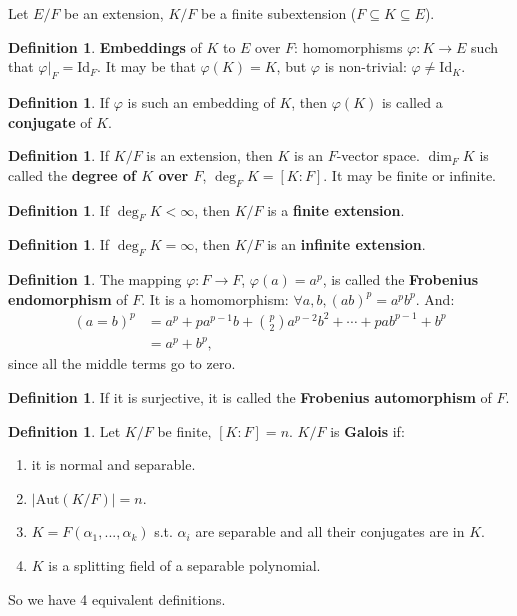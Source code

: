 \documentclass[9pt,reqno,twoside]{amsbook}
\theoremstyle{plain}
\numberwithin{section}{chapter}
\numberwithin{equation}{chapter}
\theoremstyle{definition}
\newtheorem{Def}[theorem]{Definition}
\theoremstyle{remark}
\theoremstyle{plain}
\newcommand{\sub}{\subseteq}
\newcommand{\bee}{\begin{equation}\begin{aligned}}
\newcommand{\eee}{\end{aligned}\end{equation}}
\renewcommand{\phi}{\varphi}
\begin{document}
Let $E/F$ be an extension, $K/F$ be a finite subextension ($F\sub K \sub E$). 

\begin{Def}
\textbf{Embeddings} of $K$ to $E$ over $F$:
homomorphisms $\phi:K \to E$ such that $\phi|_F = \text{Id}_F$. It may be that $\phi(K) = K$, but $\phi$ is non-trivial: $\phi \neq \text{Id}_K$. 
\end{Def}

\begin{Def}
If $\phi$ is such an embedding of $K$, then $\phi(K)$ is called a \textbf{conjugate} of $K$. 
\end{Def}

\begin{Def}
If $K/F$ is an extension, then $K$ is an $F$-vector space. $\dim_FK$ is called the \textbf{degree of $K$ over $F$}, $\deg_FK = [K:F]$. It may be finite or infinite. 
\end{Def}

\begin{Def}
If $\deg_FK < \infty$, then $K/F$ is a \textbf{finite extension}. 
\end{Def}

\begin{Def}
If $\deg_FK = \infty$, then $K/F$ is an \textbf{infinite extension}. 
\end{Def}

\begin{Def}
The mapping $\phi:F \to F$, $\phi(a) = a^p$, is called the \textbf{Frobenius endomorphism} of $F$. It is a homomorphism: $\forall a,b, (ab)^p = a^pb^p$. And:
\bee
(a = b)^p &= a^p + pa^{p - 1}b + \binom{p}{2}a^{p - 2}b^2 + \cdots + pab^{p - 1} + b^p\\
&= a^p + b^p,
\eee
since all the middle terms go to zero. 
\end{Def}

\begin{Def}
If it is surjective, it is called the \textbf{Frobenius automorphism} of $F$. 
\end{Def}

\begin{Def}
Let $K/F$ be finite, $[K:F] = n$. $K/F$ is \textbf{Galois} if:
\begin{enumerate}
\item it is normal and separable. 
\item $|\text{Aut}(K/F)| = n$.
\item $K = F(\alpha_1,...,\alpha_k)$ s.t. $\alpha_i$ are separable and all their conjugates are in $K$.
\item $K$ is a splitting field of a separable polynomial.
\end{enumerate}
So we have 4 equivalent definitions. 
\end{Def}
\end{document}

